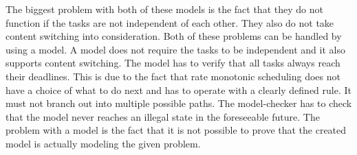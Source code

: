 The biggest problem with both of these models is the fact that they do not function if the tasks are not independent of each other. They also do not take content switching into consideration. Both of these problems can be handled by using a model. A model does not require the tasks to be independent and it also supports content switching. The model has to verify that all tasks always reach their deadlines. This is due to the fact that rate monotonic scheduling does not have a choice of what to do next and has to operate with a clearly defined rule. It must not branch out into multiple possible paths. The model-checker has to check that the model never reaches an illegal state in the foreseeable future. The problem with a model is the fact that it is not possible to prove that the created model is actually modeling the given problem.

